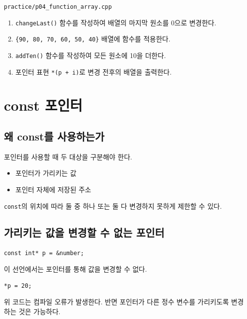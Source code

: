 \documentclass[11pt,a4paper]{article}
\begin{document}
\begin{practicebox}
\texttt{practice/p04\_function\_array.cpp}
\begin{enumerate}[leftmargin=1.5em]
    \item \texttt{changeLast()} 함수를 작성하여 배열의 마지막 원소를 0으로 변경한다.
    \item \texttt{\{90, 80, 70, 60, 50, 40\}} 배열에 함수를 적용한다.
    \item \texttt{addTen()} 함수를 작성하여 모든 원소에 10을 더한다.
    \item 포인터 표현 \texttt{*(p + i)}로 변경 전후의 배열을 출력한다.
\end{enumerate}
\end{practicebox}

\section{const 포인터}

\subsection{왜 const를 사용하는가}

포인터를 사용할 때 두 대상을 구분해야 한다.

\begin{itemize}[leftmargin=1.5em]
    \item 포인터가 가리키는 값
    \item 포인터 자체에 저장된 주소
\end{itemize}

\texttt{const}의 위치에 따라 둘 중 하나 또는 둘 다 변경하지 못하게 제한할 수 있다.

\subsection{가리키는 값을 변경할 수 없는 포인터}

\begin{lstlisting}
const int* p = &number;
\end{lstlisting}

이 선언에서는 포인터를 통해 값을 변경할 수 없다.

\begin{lstlisting}
*p = 20;
\end{lstlisting}

위 코드는 컴파일 오류가 발생한다. 반면 포인터가 다른 정수 변수를 가리키도록 변경하는 것은 가능하다.
\end{document}
